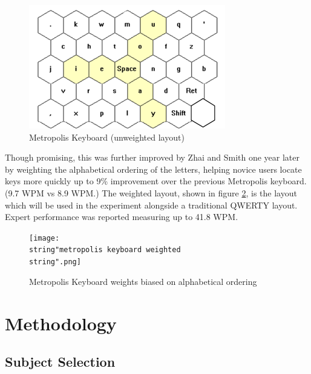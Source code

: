 \documentclass[english]{vgtc}
\begin{document}
\begin{figure}
  \centering
  \includegraphics[width=0.95\columnwidth]{Metropolis}
  \caption{Metropolis Keyboard (unweighted layout) \cite{Zhai00}}
  \label{fig:metropolis}
\end{figure}

Though promising, this was further improved by Zhai and Smith one
year later \cite{Zhai01} by weighting the alphabetical ordering of
the letters, helping novice users locate keys more quickly up to
9\% improvement over the previous Metropolis keyboard. (9.7 WPM vs 8.9 WPM.) The weighted
layout, shown in figure \ref{fig:metropolis_weighted}, is the layout which will be used in the
experiment alongside a traditional QWERTY layout.  Expert performance was reported measuring up to 41.8 WPM.

\begin{figure}
  \centering
  \texttt{[image: \\string"metropolis keyboard weighted\\string".png]}
  \caption{Metropolis Keyboard weights biased on alphabetical ordering \cite{Zhai01}}
  \label{fig:metropolis_weighted}
\end{figure}


\section{Methodology}

\subsection{Subject Selection}
\end{document}
